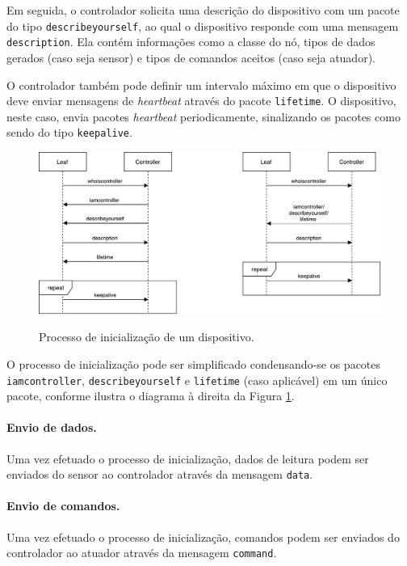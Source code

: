 Em seguida, o controlador solicita uma descrição do dispositivo com um pacote do tipo \texttt{describeyourself}, ao qual o dispositivo responde com uma mensagem \texttt{description}. Ela contém informações como a classe do nó, tipos de dados gerados (caso seja sensor) e tipos de comandos aceitos (caso seja atuador).

O controlador também pode definir um intervalo máximo em que o dispositivo deve enviar mensagens de \textit{heartbeat} através do pacote \texttt{lifetime}. O dispositivo, neste caso, envia pacotes \textit{heartbeat} periodicamente, sinalizando os pacotes como sendo do tipo \texttt{keepalive}.

\begin{figure}[h]
	\centering

	\caption{Processo de inicialização de um dispositivo.} 
	\medskip
  \includegraphics[width=\textwidth]{imagens/uml_handshake.pdf}
  \label{fig:uml_handshake}
\end{figure}

O processo de inicialização pode ser simplificado condensando-se os pacotes \texttt{iamcontroller}, \texttt{describeyourself} e \texttt{lifetime} (caso aplicável) em um único pacote, conforme ilustra o diagrama à direita da Figura \ref{fig:uml_handshake}.

\paragraph*{Envio de dados.} Uma vez efetuado o processo de inicialização, dados de leitura podem ser enviados do sensor ao controlador através da mensagem \texttt{data}.

\paragraph*{Envio de comandos.} Uma vez efetuado o processo de inicialização, comandos podem ser enviados do controlador ao atuador através da mensagem \texttt{command}.


